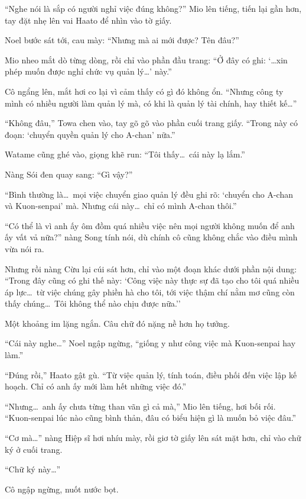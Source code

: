 \documentclass[../main.tex]{subfiles}
\begin{document}
``Nghe nói là sắp có người nghỉ việc đúng không?'' Mio lên tiếng, tiến lại gần hơn, tay đặt nhẹ lên vai Haato để nhìn vào tờ giấy.

Noel bước sát tới, cau mày: ``Nhưng mà ai mới được? Tên đâu?''

Mio nheo mắt dò từng dòng, rồi chỉ vào phần đầu trang: ``Ở đây có ghi: `\dots xin phép muốn được nghỉ chức vụ quản lý\dots' này.''

Cô ngẩng lên, mắt hơi co lại vì cảm thấy có gì đó không ổn. ``Nhưng công ty mình có nhiều người làm quản lý mà, có khi là quản lý tài chính, hay thiết kế\dots''

``Không đâu,'' Towa chen vào, tay gõ gõ vào phần cuối trang giấy. ``Trong này có đoạn: `chuyển quyền quản lý cho A-chan' nữa.''

Watame cũng ghé vào, giọng khẽ run: ``Tôi thấy\dots\ cái này lạ lắm.''

Nàng Sói đen quay sang: ``Gì vậy?''

``Bình thường là\dots\ mọi việc chuyển giao quản lý đều ghi rõ: `chuyển cho A-chan và Kuon-senpai' mà. Nhưng cái này\dots\ chỉ có mình A-chan thôi.''

``Có thể là vì anh ấy ôm đồm quá nhiều việc nên mọi người không muốn để anh ấy vất vả nữa?'' nàng Song tính nói, dù chính cô cũng không chắc vào điều mình vừa nói ra.

Nhưng rồi nàng Cừu lại cúi sát hơn, chỉ vào một đoạn khác dưới phần nội dung: ``Trong đây cũng có ghi thế này: `Công việc này thực sự đã tạo cho tôi quá nhiều áp lực\dots\ từ việc chúng gây phiền hà cho tôi, tới việc thậm chí nằm mơ cũng còn thấy chúng\dots\ Tôi không thể nào chịu được nữa.''

Một khoảng im lặng ngắn. Câu chữ đó nặng nề hơn họ tưởng.

``Cái này nghe\dots'' Noel ngập ngừng, ``giống y như công việc mà Kuon-senpai hay làm.''

``Đúng rồi,'' Haato gật gù. ``Từ việc quản lý, tính toán, điều phối đến việc lập kế hoạch. Chỉ có anh ấy mới làm hết những việc đó.''

``Nhưng\dots\ anh ấy chưa từng than vãn gì cả mà,'' Mio lên tiếng, hơi bối rối. ``Kuon-senpai lúc nào cũng bình thản, đâu có biểu hiện gì là muốn bỏ việc đâu.''

``Cơ mà\dots'' nàng Hiệp sĩ hơi nhíu mày, rồi giơ tờ giấy lên sát mặt hơn, chỉ vào chữ ký ở cuối trang.

``Chữ ký này\dots''

Cô ngập ngừng, nuốt nước bọt.
\end{document}
